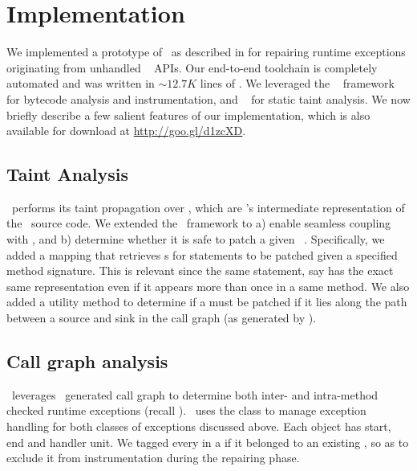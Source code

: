 \section{Implementation}
\label{sec:implementation}

We implemented a prototype of \tool\ as described in  for
repairing runtime exceptions originating from unhandled \java\ 
APIs. Our end-to-end toolchain is completely automated and was written in
$\sim$$12.7K$ lines of \java. We leveraged the \soot~\cite{soot} framework for
bytecode analysis and instrumentation, and \infoflow~\cite{infoflow} for static
taint analysis.
We now briefly describe a few salient features of our implementation, which is
also available for download at \url{http://goo.gl/d1zcXD}.

\subsection{Taint Analysis}

\infoflow\ performs its taint propagation over , which are \soot's
intermediate representation of the \java\ source code. We extended the
\infoflow\ framework to a) enable seamless coupling with \soot, and b) determine
whether it is safe to patch a given \soot\ . Specifically, we added
a mapping that retrieves s for statements to be patched given a
specified method signature. This is relevant since the same statement, say
 has the exact same representation even if it appears more
than once in a same method. We also added a utility method to determine if a
 must be patched if it lies along the path between a source and sink 
in the call graph (as generated by \soot).

\subsection{Call graph analysis}
\label{subsec:callChainLookUp}

\tool\ leverages \soot\ generated call graph to determine both inter- and
intra-method checked runtime exceptions (recall ). \soot\
uses the  class to manage exception handling for both classes of
exceptions discussed above. Each  object has start, end and handler
unit.  We tagged every \code{Unit} in a \code{HashMap} if it belonged to an
existing \code{Trap}, so as to exclude it from instrumentation during the
repairing phase.

